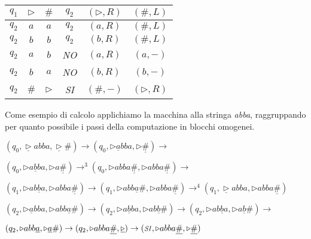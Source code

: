 \begin{example}
\begin{table}[H]
\begin{tabular}{ |c c c|c c c| }
            $q_1$ & $\triangleright$ & $\#$             & $q_2$                                               & $(\triangleright,R)$ & $(\#,L)$             \\
            \hline
            $q_2$ & $a$              & $a$              & $q_2$                                               & $(a,R)$              & $(\#,L)$             \\
            $q_2$ & $b$              & $b$              & $q_2$                                               & $(b,R)$              & $(\#,L)$             \\
            $q_2$ & $a$              & $b$              & \textit{\footnotesize NO}                           & $(a,R)$              & $(a,-)$              \\
            $q_2$ & $b$              & $a$              & \textit{\footnotesize NO}                           & $(b,R)$              & $(b,-)$              \\
            $q_2$ & $\#$             & $\triangleright$ & \textit{\footnotesize SI}                           & $(\#,-)$             & $(\triangleright,R)$ \\
            \hline
        \end{tabular}
    \end{table}

    \noindent Come esempio di calcolo applichiamo la macchina alla stringa \textit{abba}, raggruppando per quanto possibile i passi della computazione in blocchi omogenei.
    \item $(q_0,\underline{\triangleright} abba, \underline{\triangleright} \#) \rightarrow (q_0,\triangleright \underline{a}bba, \triangleright \underline{\#}) \rightarrow$
    \item\qquad $ (q_0,\triangleright a\underline{b}ba, \triangleright a \underline{\#}) \rightarrow^3 (q_0,\triangleright abba\underline{\#}, \triangleright abba \underline{\#})\rightarrow $
    \item
    \item $(q_1,\triangleright ab\underline{b}a, \triangleright abba\underline{\#}) \rightarrow (q_1, \triangleright abb\underline{a}\#, \triangleright abba \underline{\#})\rightarrow^4 (q_1,\underline{\triangleright} abba, \triangleright abba \underline{\#})$
    \item
    \item $(q_2,\triangleright \underline{a}bba, \triangleright abb\underline{a}\#) \rightarrow (q_2,\triangleright a\underline{b}ba, \triangleright ab\underline{b}\#) \rightarrow (q_2,\triangleright ab\underline{b}a, \triangleright a\underline{b}\#) \rightarrow$
    \item \qquad$(q_2,\triangleright abb\underline{a}, \triangleright \underline{a}\#) \rightarrow (q_2,\triangleright abba\underline{\#}, \underline{\triangleright}) \rightarrow (\mbox{\textit{\footnotesize SI}},\triangleright abba\underline{\#}, \triangleright \underline{\#})$
\end{example}


